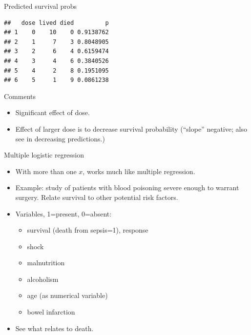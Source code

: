 \begin{frame}[fragile]{Predicted survival probs}

 
\begin{knitrout}
\color{fgcolor}\begin{kframe}
\begin{alltt}
\hlkwb{=}\hlstd{=}\hlstd{)}
\end{alltt}
\begin{verbatim}
##   dose lived died         p
## 1    0    10    0 0.9138762
## 2    1     7    3 0.8048905
## 3    2     6    4 0.6159474
## 4    3     4    6 0.3840526
## 5    4     2    8 0.1951095
## 6    5     1    9 0.0861238
\end{verbatim}
\end{kframe}
\end{knitrout}
  
  

  
\end{frame}

\begin{frame}[fragile]{Comments}

\begin{itemize}
\item Significant effect of dose. 
\item Effect of larger dose is to decrease survival probability
  (``slope'' negative; also see in decreasing predictions.)
\end{itemize}
  
\end{frame}


\begin{frame}{Multiple logistic regression}

  \begin{itemize}
  \item With more than one $x$, works much like multiple regression.
  \item Example: study of patients with blood poisoning severe enough to warrant surgery. Relate survival to other potential risk factors.
  \item Variables, 1=present, 0=absent:
    \begin{itemize}
    \item survival (death from sepsis=1), response
    \item shock
    \item malnutrition
    \item alcoholism
    \item age (as numerical variable)
    \item bowel infarction
    \end{itemize}
  \item See what relates to death.
  \end{itemize}


  
\end{frame}

